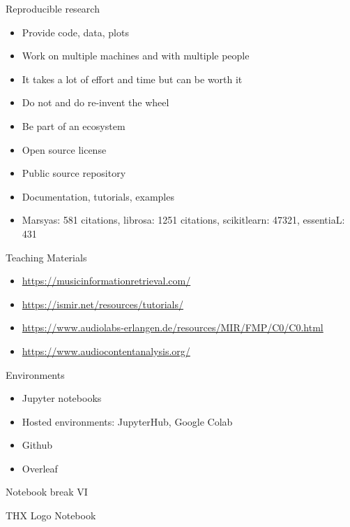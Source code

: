 \documentclass[12pt]{beamer}
\begin{document}
\begin{frame}{Reproducible research}
  \begin{itemize}
  \item{Provide code, data, plots}
  \item{Work on multiple machines and with multiple people}
  \item{It takes a lot of effort and time but can be worth it}
  \item{Do not and do re-invent the wheel}
  \item{Be part of an ecosystem}
  \item{Open source license}
  \item{Public source repository}
  \item{Documentation, tutorials, examples}
  \item{Marsyas: 581 citations, librosa: 1251 citations, scikitlearn: 47321, essentiaL: 431}
  \end{itemize} 
\end{frame} 

\begin{frame}{Teaching Materials}
  \begin{itemize}
  \item{\url{https://musicinformationretrieval.com/}}
  \item{\url{https://ismir.net/resources/tutorials/}}
  \item{\url{https://www.audiolabs-erlangen.de/resources/MIR/FMP/C0/C0.html}}
  \item{\url{https://www.audiocontentanalysis.org/}}
  \end{itemize} 
\end{frame}


\begin{frame}{Environments}

  \begin{itemize}
  \item{Jupyter notebooks}
  \item{Hosted environments: JupyterHub, Google Colab}
  \item{Github}
  \item{Overleaf}
  \end{itemize} 

  \end{frame} 

\begin{frame}{Notebook break VI}

  THX Logo Notebook 
\end{frame}
\end{document}
